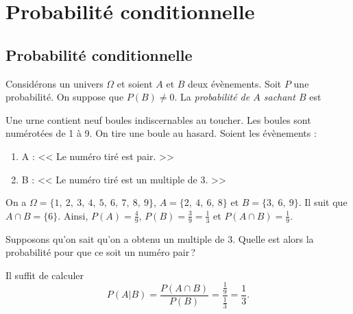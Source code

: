       \section{Probabilit\'e conditionnelle}
            \subsection{Probabilit\'e conditionnelle}
            Consid\'erons un univers $\Omega$ et soient $A$ et $B$ deux \'ev\`enements.
            Soit $P$ une probabilit\'e.
            On suppose que $P(B) \neq 0$.
            La \emph{probabilit\'e de $A$ sachant $B$} est 
            \begin{ex}
                  Une urne contient neuf boules indiscernables au toucher.
                  Les boules sont num\'erot\'ees de 1 \`a 9.
                  On tire une boule au hasard.
                  Soient les \'ev\`enements : 
                  \begin{enumerate}
                        \item A : << Le num\'ero tir\'e est pair. >>
                        \item B : << Le num\'ero tir\'e est un multiple de 3. >>
                  \end{enumerate}
                  
                  On a $ \Omega = \{ 1,\ 2,\ 3,\ 4,\ 5,\ 6,\ 7,\ 8,\ 9 \}$,
                       $ A = \{ 2,\ 4,\ 6,\ 8 \}$ et
                       $ B = \{ 3,\ 6,\ 9 \}$.
                  Il suit que $A \cap B = \{ 6 \}$.
                  Ainsi, $P(A) = \frac{4}{9}$, $P(B) = \frac{3}{9} = \frac{1}{3}$ et $P(A\cap B) = \frac{1}{9}$.
                  
                  Supposons qu'on sait qu'on a obtenu un multiple de 3.
                  Quelle est alors la probabilit\'e pour que ce soit un num\'ero pair\,?
                  
                  Il suffit de calculer 
                        \[
                        P(A|B) = \frac{P(A\cap B)}{P(B)} = \frac{\frac{1}{9}}{\frac{1}{3}} = \frac{1}{3}.
                        \]
            \end{ex}
